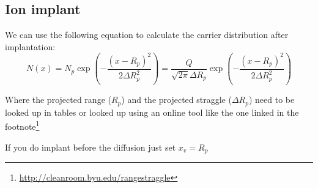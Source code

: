 \subsection{Ion implant}
We can use the following equation to calculate the carrier distribution after implantation:
\begin{equation}
N(x)
=
N_p \exp\left(-\frac{(x-R_p)^2}{2\Delta R_p^2}\right)
=
\frac{Q}{\sqrt{2\pi}\Delta R_p}\exp\left(-\frac{(x-R_p)^2}{2\Delta R_p^2}\right)
\end{equation}

Where the projected range ($R_p$) and the projected straggle ($\Delta R_p$) need to be looked up in tables or looked up using an online tool like the one linked in the footnote\footnote{\url{http://cleanroom.byu.edu/rangestraggle}}

\begin{mdframed}[linewidth=2pt,linecolor=red]
If you do implant before the diffusion just set $x_v=R_p$
\end{mdframed}